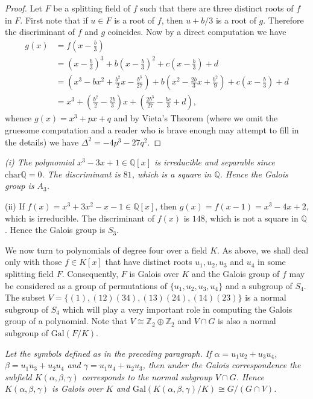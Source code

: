\begin{proof}
Let $F$ be a splitting field of $f$ such that there are three distinct roots of $f$ in $F$. First note that if $u\in F$ is a root of $f$, then $u+b/3$ is a root of $g$. Therefore the discriminant of $f$ and $g$ coincides. Now by a direct computation we have 
$$
\begin{aligned}
g\left( x \right) &=f\left( x-\frac{b}{3} \right) 
\\
&=\left( x-\frac{b}{3} \right) ^3+b\left( x-\frac{b}{3} \right) ^2+c\left( x-\frac{b}{3} \right) +d
\\
&=\left( x^3-bx^2+\frac{b^2}{2}x-\frac{b^3}{27} \right) +b\left( x^2-\frac{2b}{3}x+\frac{b^2}{9} \right) +c\left( x-\frac{b}{3} \right) +d
\\
&=x^3+\left( \frac{b^2}{2}-\frac{2b}{3} \right) x+\left( \frac{2b^3}{27}-\frac{bc}{3}+d \right) ,
\end{aligned}
$$
whence $g(x)=x^3+px+q$ and by Vieta's Theorem (where we omit the gruesome computation and a reader who is brave enough may attempt to fill in the details) we have $\Delta^2=-4p^3-27q^2$.
\end{proof}
\begin{example}\em
(i) The polynomial $x^3-3x+1\in\mathbb{Q}[x]$ is irreducible and separable since $\mathrm{char}\mathbb{Q}=0$. The discriminant is $81$, which is a square in $\mathbb{Q}$. Hence the Galois group is $A_3$.\par
(ii) If $f(x)=x^3+3x^2-x-1\in\mathbb{Q}[x]$, then $g(x)=f(x-1)=x^3-4x+2$, which is irreducible. The discriminant of $f(x)$ is $148$, which is not a square in $\mathbb{Q}$. Hence the Galois group is $S_3$.
\end{example}
We now turn to polynomials of degree four over a field $K$. As above, we shall deal only with those $f\in K[x]$ that have distinct roots $u_1,u_2,u_3$ and $u_4$ in some splitting field $F$. Consequently, $F$ is Galois over $K$ and the Galois group of $f$ may be considered as a group of permutations of $\{u_1,u_2,u_3,u_4\}$ and a subgroup of $S_4$. The subset $V=\{(1),(12)(34),(13)(24),(14)(23)\}$ is a normal subgroup of $S_4$ which will play a very important role in computing the Galois group of a polynomial. Note that $V\cong\mathbb{Z}_2\oplus\mathbb{Z}_2$ and $V\cap G$ is also a normal subgroup of $\mathrm{Gal}(F/K)$.
\begin{lemma}\em
Let the symbols defined as in the preceding paragraph. If $\alpha=u_1u_2+u_3u_4$, $\beta=u_1u_3+u_2u_4$ and $\gamma=u_1u_4+u_2u_3$, then under the Galois correspondence the subfield $K(\alpha,\beta,\gamma)$ corresponds to the normal subgroup $V\cap G$. Hence $K(\alpha,\beta,\gamma)$ is Galois over $K$ and $\mathrm{Gal}(K(\alpha,\beta,\gamma)/K)\cong G/(G\cap V)$.
\end{lemma}
